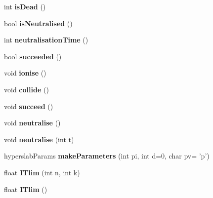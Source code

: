 \begin{DoxyCompactItemize}
\item 
\hypertarget{classParticle_acb8f2b23c3e0ee1edccdb33745e147a6}{int {\bfseries is\+Dead} ()}\label{classParticle_acb8f2b23c3e0ee1edccdb33745e147a6}

\item 
\hypertarget{classParticle_a67ac991aa23ba153f91613d7990d5fd6}{bool {\bfseries is\+Neutralised} ()}\label{classParticle_a67ac991aa23ba153f91613d7990d5fd6}

\item 
\hypertarget{classParticle_a21a5d5376f547a995e3f95f9a73f3af1}{int {\bfseries neutralisation\+Time} ()}\label{classParticle_a21a5d5376f547a995e3f95f9a73f3af1}

\item 
\hypertarget{classParticle_a185ae9b165539aab733372746f254c73}{bool {\bfseries succeeded} ()}\label{classParticle_a185ae9b165539aab733372746f254c73}

\item 
\hypertarget{classParticle_ab254d9496b2f597d0cd44131c6e6188e}{void {\bfseries ionise} ()}\label{classParticle_ab254d9496b2f597d0cd44131c6e6188e}

\item 
\hypertarget{classParticle_abf35003962728175aa66fcf97daa3aee}{void {\bfseries collide} ()}\label{classParticle_abf35003962728175aa66fcf97daa3aee}

\item 
\hypertarget{classParticle_ab4cfb079b1580b7624f105696ea878f6}{void {\bfseries succeed} ()}\label{classParticle_ab4cfb079b1580b7624f105696ea878f6}

\item 
\hypertarget{classParticle_ad8a3ecc1c74542944be9b8c16bf46c2d}{void {\bfseries neutralise} ()}\label{classParticle_ad8a3ecc1c74542944be9b8c16bf46c2d}

\item 
\hypertarget{classParticle_a0e5cdf0c82626cad205f541c29e212bd}{void {\bfseries neutralise} (int t)}\label{classParticle_a0e5cdf0c82626cad205f541c29e212bd}

\item 
\hypertarget{classParticle_a149d590bbec46fe510689103952a225b}{hyperslab\+Params {\bfseries make\+Parameters} (int pi, int d=0, char pv= 'p')}\label{classParticle_a149d590bbec46fe510689103952a225b}

\item 
\hypertarget{classParticle_a9266438ab7b68a80b2f0a3020860db96}{float {\bfseries I\+Tlim} (int n, int k)}\label{classParticle_a9266438ab7b68a80b2f0a3020860db96}

\item 
\hypertarget{classParticle_a9624cc61d6a8ce392d1c7355e9518a54}{float {\bfseries I\+Tlim} ()}\label{classParticle_a9624cc61d6a8ce392d1c7355e9518a54}

\end{DoxyCompactItemize}
